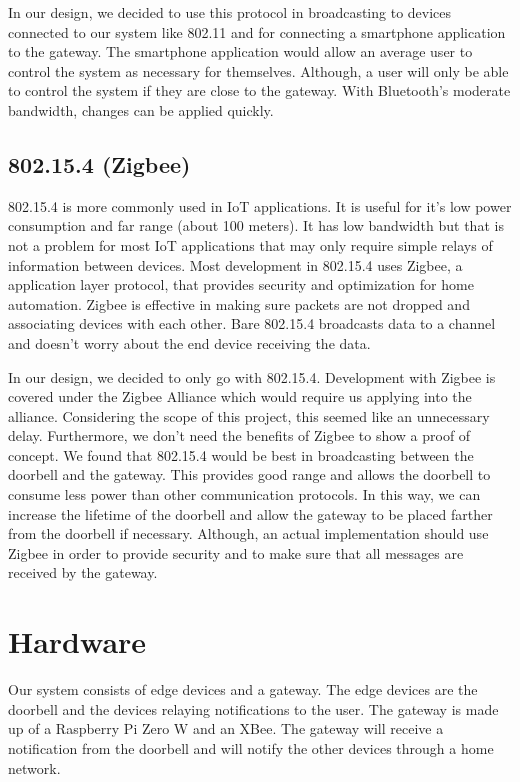     In our design, we decided to use this protocol in broadcasting to devices connected to our system like 802.11 and for connecting a smartphone application to the gateway. The smartphone application would allow an average user to control the system as necessary for themselves. Although, a user will only be able to control the system if they are close to the gateway. With Bluetooth's moderate bandwidth, changes can be applied quickly.

\subsection{802.15.4 (Zigbee)}
802.15.4 is more commonly used in IoT applications. It is useful for it’s low power consumption and far range (about 100 meters). It has low bandwidth but that is not a problem for most IoT applications that may only require simple relays of information between devices. Most development in 802.15.4 uses Zigbee, a application layer protocol, that provides security and optimization for home automation. Zigbee is effective in making sure packets are not dropped and associating devices with each other. Bare 802.15.4 broadcasts data to a channel and doesn't worry about the end device receiving the data.
 
    In our design, we decided to only go with 802.15.4. Development with Zigbee is covered under the Zigbee Alliance which would require us applying into the alliance. Considering the scope of this project, this seemed like an unnecessary delay. Furthermore, we don’t need the benefits of Zigbee to show a proof of concept. We found that 802.15.4 would be best in broadcasting between the doorbell and the gateway. This provides good range and allows the doorbell to consume less power than other communication protocols. In this way, we can increase the lifetime of the doorbell and allow the gateway to be placed farther from the doorbell if necessary. Although, an actual implementation should use Zigbee in order to provide security and to make sure that all messages are received by the gateway.

\section{Hardware}
Our system consists of edge devices and a gateway. The edge devices are the doorbell and the devices relaying notifications to the user. The gateway is made up of a Raspberry Pi Zero W and an XBee. The gateway will receive a notification from the doorbell and will notify the other devices through a home network.

